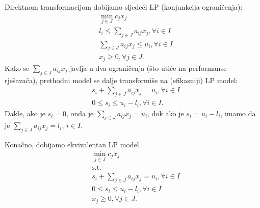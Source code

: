 \documentclass[a4paper, utf8, 11pt, colorlinks]{book}
\begin{document}
Direktnom transformacijom dobijamo sljedeći LP (konjunkcija ograničenja): 
\begin{align*}
	& \min_{j \in J } c_j x_j \\
	&  l_i \leq \sum_{j \in J} a_{ij} x_j, \forall i\in I \\
	&  \sum_{j \in J} a_{ij} x_j \leq u_i, \forall i\in I \\
	&  x_j \geq 0, \forall j \in J.
\end{align*}
Kako    se $\sum_{j \in J} a_{ij} x_j$ javlja u dva ograničenja (što utiče na performanse rješavača), prethodni model se dalje transformiše na (efikasniji) LP model:
\begin{align*}
	&s_i + \sum_{j \in J} a_{ij} x_j = u_i, \forall i \in I \\
	& 0 \leq s_i \leq  u_i - l_i, \forall i \in I.
\end{align*}
Dakle, ako je $s_i = 0$, onda je  $\sum_{j \in J} a_{ij} x_j = u_i$, dok ako je  $s_i = u_i - l_i$, imamo da je $\sum_{j \in J} a_{ij} x_j = l_i$, $i\in I$. 

Konačno, dobijamo ekvivalentan LP model
\begin{align*}
	&\min_{j \in J } c_j x_j \\
	& \mbox{s.t.} \nonumber \\
	&s_i + \sum_{j \in J} a_{ij} x_j = u_i, \forall i \in I \\ 
	&  0 \leq s_i \leq  u_i - l_i, \forall i \in I \\
	& x_j \geq 0, \forall j \in J.
\end{align*}
\end{document}
